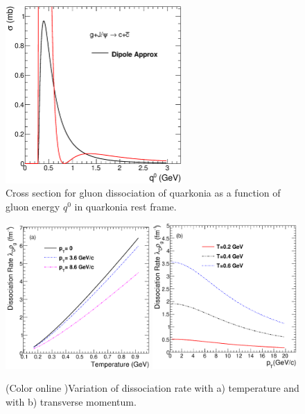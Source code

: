 \documentclass[aps,prc,preprint,superscriptaddress,showpacs,showkeys]{revtex4-1}
\begin{document}
\begin{figure}
\includegraphics[width=0.60\textwidth]{Fig2_SigmaDq0.eps}
\caption{Cross section for gluon dissociation of quarkonia as a function of gluon energy $q^{0}$ in
quarkonia rest frame.}
\label{fig:SigmaDQ0}
\end{figure}

\begin{figure}
\includegraphics[width=0.49\textwidth]{Fig3a_DRateVsT.eps}
\includegraphics[width=0.49\textwidth]{Fig3b_DRateVsPt.eps}
\caption{(Color online )Variation of dissociation rate with a) temperature and with b) transverse momentum.}
\label{fig:DRateVsTempAndPt}
\end{figure}
\end{document}
